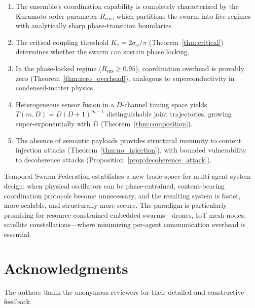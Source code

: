 \documentclass[twocolumn,10pt]{article}
\newcommand{\Rens}{R_{\mathrm{ens}}}
\newcommand{\Kc}{K_c}
\newcommand{\sigmaomega}{\sigma_{\omega}}
\begin{document}
\begin{enumerate}[leftmargin=*, label=(\arabic*)]
\item The ensemble's coordination capability is completely characterized by
      the Kuramoto order parameter $\Rens$, which partitions the swarm into
      five regimes with analytically sharp phase-transition boundaries.

\item The critical coupling threshold $\Kc = 2\sigmaomega/\pi$
      (Theorem~\ref{thm:critical}) determines whether the swarm can sustain
      phase locking.

\item In the phase-locked regime ($\Rens \geq 0.95$), coordination overhead
      is provably zero (Theorem~\ref{thm:zero_overhead}), analogous to
      superconductivity in condensed-matter physics.

\item Heterogeneous sensor fusion in a $D$-channel timing space yields
      $T(m,D) = D(D+1)^{m-1}$ distinguishable joint trajectories, growing
      super-exponentially with $D$ (Theorem~\ref{thm:composition}).

\item The absence of semantic payloads provides structural immunity to content
      injection attacks (Theorem~\ref{thm:no_injection}), with bounded
      vulnerability to decoherence attacks (Proposition~\ref{prop:decoherence_attack}).
\end{enumerate}

Temporal Swarm Federation establishes a new trade-space for multi-agent system
design: when physical oscillators can be phase-entrained, content-bearing
coordination protocols become unnecessary, and the resulting system is faster,
more scalable, and structurally more secure. The paradigm is particularly
promising for resource-constrained embedded swarms---drones, IoT mesh nodes,
satellite constellations---where minimizing per-agent communication overhead
is essential.

\section*{Acknowledgments}
The authors thank the anonymous reviewers for their detailed and constructive
feedback.



\end{document}
